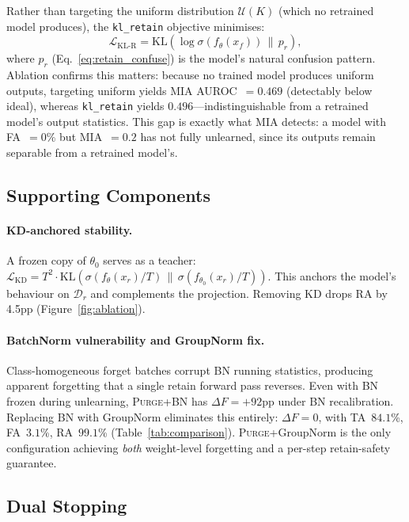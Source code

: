 \documentclass[letterpaper]{article} %
\newcommand{\ours}{\textsc{Purge}}
\newcommand{\klr}{\texttt{kl\_retain}}
\newcommand{\KL}{\mathrm{KL}}
\newcommand{\Dr}{\mathcal{D}_r}
\newcommand{\losskd}{\mathcal{L}_{\mathrm{KD}}}
\begin{document}
Rather than targeting the uniform distribution $\mathcal{U}(K)$ (which no retrained model produces), the \klr{} objective minimises:
\begin{equation}\label{eq:kl_retain}
\mathcal{L}_{\text{KL-R}} = \KL\!\left(\log\sigma(f_\theta(x_f)) \,\|\, p_r\right),
\end{equation}
where $p_r$ (Eq.~\ref{eq:retain_confuse}) is the model's natural confusion pattern.
Ablation confirms this matters: because no trained model produces uniform outputs, targeting uniform yields MIA AUROC~$= 0.469$ (detectably below ideal), whereas \klr{} yields $0.496$---indistinguishable from a retrained model's output statistics.
This gap is exactly what MIA detects: a model with FA~$= 0$\% but MIA~$= 0.2$ has not fully unlearned, since its outputs remain separable from a retrained model's.

\subsection{Supporting Components}

\paragraph{KD-anchored stability.}
A frozen copy of $\theta_0$ serves as a teacher:
$\losskd = T^2 \cdot \KL(\sigma(f_\theta(x_r)/T) \,\|\, \sigma(f_{\theta_0}(x_r)/T))$.
This anchors the model's behaviour on $\Dr$ and complements the projection.
Removing KD drops RA by 4.5pp (Figure~\ref{fig:ablation}).

\paragraph{BatchNorm vulnerability and GroupNorm fix.}\label{sec:bn}
Class-homogeneous forget batches corrupt BN running statistics, producing apparent forgetting that a single retain forward pass reverses.
Even with BN frozen during unlearning, \ours{}+BN has $\Delta F = +92$pp under BN recalibration.
Replacing BN with GroupNorm eliminates this entirely: $\Delta F = 0$, with TA~$84.1$\%, FA~$3.1$\%, RA~$99.1$\% (Table~\ref{tab:comparison}).
\ours{}+GroupNorm is the only configuration achieving \emph{both} weight-level forgetting and a per-step retain-safety guarantee.

\subsection{Dual Stopping}\label{sec:stopping}
\end{document}
